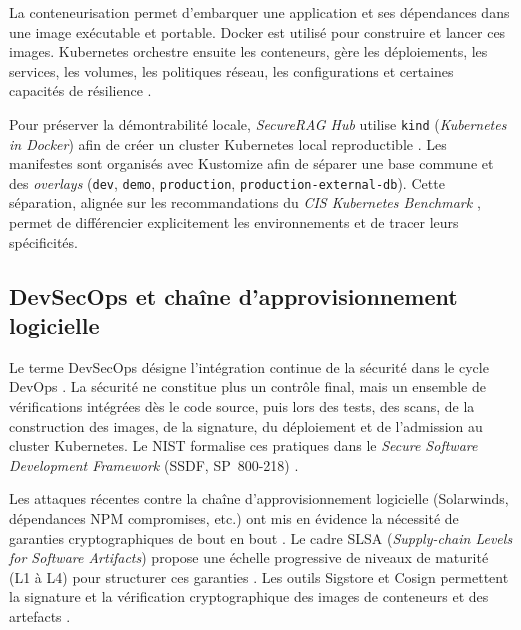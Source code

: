 La conteneurisation permet d'embarquer une application et ses dépendances dans une image exécutable et portable. Docker est utilisé pour construire et lancer ces images. Kubernetes orchestre ensuite les conteneurs, gère les déploiements, les services, les volumes, les politiques réseau, les configurations et certaines capacités de résilience \cite{burns_kubernetes_2022,kubernetes_docs}.

Pour préserver la démontrabilité locale, \textit{SecureRAG Hub} utilise \texttt{kind} (\textit{Kubernetes in Docker}) afin de créer un cluster Kubernetes local reproductible \cite{kind_docs}. Les manifestes sont organisés avec Kustomize \cite{kustomize_docs} afin de séparer une base commune et des \textit{overlays} (\texttt{dev}, \texttt{demo}, \texttt{production}, \texttt{production-external-db}). Cette séparation, alignée sur les recommandations du \textit{CIS Kubernetes Benchmark} \cite{cis_k8s_benchmark}, permet de différencier explicitement les environnements et de tracer leurs spécificités.

\subsection{DevSecOps et chaîne d'approvisionnement logicielle}

Le terme DevSecOps désigne l'intégration continue de la sécurité dans le cycle DevOps \cite{myrbakken_devsecops_2017,humble_continuous_delivery}. La sécurité ne constitue plus un contrôle final, mais un ensemble de vérifications intégrées dès le code source, puis lors des tests, des scans, de la construction des images, de la signature, du déploiement et de l'admission au cluster Kubernetes. Le NIST formalise ces pratiques dans le \textit{Secure Software Development Framework} (SSDF, SP~800-218) \cite{nist_ssdf_800218}.

Les attaques récentes contre la chaîne d'approvisionnement logicielle (Solarwinds, dépendances NPM compromises, etc.) ont mis en évidence la nécessité de garanties cryptographiques de bout en bout \cite{ohm_supply_chain_attacks_2020}. Le cadre SLSA (\textit{Supply-chain Levels for Software Artifacts}) propose une échelle progressive de niveaux de maturité (L1 à L4) pour structurer ces garanties \cite{slsa_spec_v1}. Les outils Sigstore et Cosign permettent la signature et la vérification cryptographique des images de conteneurs et des artefacts \cite{sigstore_paper}.

